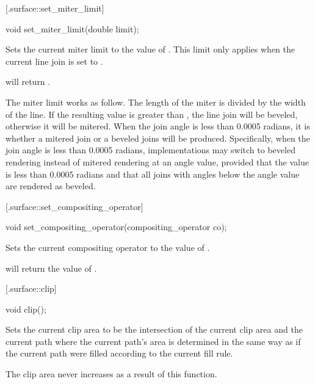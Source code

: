  [\iotwod.surface::set_miter_limit] {}

%
%
\begin{itemdecl}
void set_miter_limit(double limit);
\end{itemdecl}
\begin{itemdescr}
	\pnum
	\effects
	Sets the current miter limit to the value of . This limit only applies when the current line join is set to .
	
	\pnum
	\postconditions
	 will return .
	
	\pnum
	\remarks
	The miter limit works as follow. The length of the miter is divided by the width of the line. If the resulting value is greater than , the line join will be beveled, otherwise it will be mitered.
	\enternote
	When the join angle is less than 0.0005 radians, it is 
	 whether a mitered join or 
	a beveled joins will be produced. Specifically, when the join angle is less 
	than 0.0005 radians, implementations may switch to beveled rendering 
	instead of mitered rendering at an \impdef angle value, provided that the 
	value is less than 0.0005 radians and that all joins with angles below the 
	\impdef angle value are rendered as beveled.
	\exitnote
\end{itemdescr}

 [\iotwod.surface::set_compositing_operator] {}

%
%
\begin{itemdecl}
void set_compositing_operator(compositing_operator co);
\end{itemdecl}
\begin{itemdescr}
	\pnum
	\effects
	Sets the current compositing operator to the value of .
	
	\pnum
	\postconditions
	 will return the value of .
\end{itemdescr}

 [\iotwod.surface::clip] {}

%
%
\begin{itemdecl}
void clip();
\end{itemdecl}
\begin{itemdescr}
	\pnum
	\effects
	Sets the current clip area to be the intersection of the current clip area and the current path where the current path's area is determined in the same way as if the current path were filled according to the current fill rule.
	
	\pnum
	\realnotes
	The clip area never increases as a result of this function.
\end{itemdescr}

